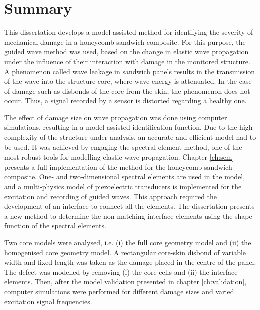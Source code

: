 
\chapter[Summary]{Summary}
\label{ch:summary}

This dissertation develops a model-assisted method for identifying the severity of mechanical damage in a honeycomb sandwich composite. 
For this purpose, the guided wave method was used, based on the change in elastic wave propagation under the influence of their interaction with damage in the monitored structure.
A phenomenon called wave leakage in sandwich panels results in the transmission of the wave into the structure core, where wave energy is attenuated.
In the case of damage such as disbonds of the core from the skin, the phenomenon does not occur.
Thus, a signal recorded by a sensor is distorted regarding a healthy one.

The effect of damage size on wave propagation was done using computer simulations, resulting in a model-assisted identification function.
Due to the high complexity of the structure under analysis, an accurate and efficient model had to be used.
It was achieved by engaging the spectral element method, one of the most robust tools for modelling elastic wave propagation.
Chapter \ref{ch:sem} presents a full implementation of the method for the honeycomb sandwich composite.
One- and two-dimensional spectral elements are used in the model, and a multi-physics model of piezoelectric transducers is implemented for the excitation and recording of guided waves.
This approach required the development of an interface to connect all the elements.
The dissertation presents a new method to determine the non-matching interface elements using the shape function of the spectral elements.

Two core models were analysed, i.e. (i) the full core geometry model and (ii) the homogenised core geometry model.
A rectangular core-skin disbond of variable width and fixed length was taken as the damage placed in the centre of the panel.
The defect was modelled by removing (i) the core cells and (ii) the interface elements.
Then, after the model validation presented in chapter \ref{ch:validation}, computer simulations were performed for different damage sizes and varied excitation signal frequencies.

